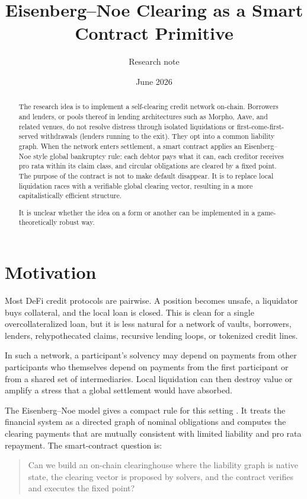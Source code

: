 \documentclass[11pt,oneside]{article}
\title{Eisenberg--Noe Clearing as a Smart Contract Primitive}
\author{Research note}
\date{June 2026}
\begin{document}
\maketitle

\begin{abstract}
The research idea is to implement a self-clearing credit network on-chain.
Borrowers and lenders, or pools thereof in lending architectures such as
Morpho, Aave, and related venues, do not resolve distress through isolated
liquidations or first-come-first-served withdrawals (lenders running to the
exit). They opt into a common liability graph.
When the network enters settlement, a smart contract applies an
Eisenberg--Noe style global bankruptcy rule: each debtor pays what it can, each
creditor receives pro rata within its claim class, and circular obligations are
cleared by a fixed point. The purpose of the contract is not to make default
disappear. It is to replace local liquidation races with a verifiable global
clearing vector, resulting in a more capitalistically efficient structure.

It is unclear whether the idea on a form or another
can be implemented in a game-theoretically robust way.
\end{abstract}

\section{Motivation}

Most DeFi credit protocols are pairwise. A position becomes unsafe, a liquidator
buys collateral, and the local loan is closed. This is clean for a single
overcollateralized loan, but it is less natural for a network of vaults,
borrowers, lenders, rehypothecated claims, recursive lending loops, or tokenized
credit lines.

In such a network, a participant's solvency may depend on payments from other
participants who themselves depend on payments from the first participant or
from a shared set of intermediaries. Local liquidation can then destroy value
or amplify a stress that a global settlement would have absorbed.

The Eisenberg--Noe model gives a compact rule for this setting
\cite{eisenberg2001systemic}. It treats the financial system as a directed
graph of nominal obligations and computes the clearing payments that are
mutually consistent with limited liability and pro rata repayment. The
smart-contract question is:

\begin{quote}
Can we build an on-chain clearinghouse where the liability graph is native
state, the clearing vector is proposed by solvers, and the contract verifies
and executes the fixed point?
\end{quote}
\end{document}
